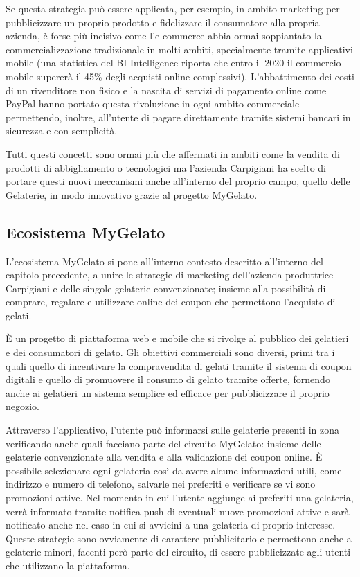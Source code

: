 Se questa strategia può essere applicata, per esempio, in ambito marketing per pubblicizzare un proprio prodotto e fidelizzare il consumatore alla propria azienda, è forse più incisivo come l'e-commerce abbia ormai soppiantato la commercializzazione tradizionale in molti ambiti, specialmente tramite applicativi mobile (una statistica del BI Intelligence riporta che entro il 2020 il commercio mobile supererà il 45\% degli acquisti online complessivi).
L'abbattimento dei costi di un rivenditore non fisico e la nascita di servizi di pagamento online come PayPal hanno portato questa rivoluzione in ogni ambito commerciale permettendo, inoltre, all'utente di pagare direttamente tramite sistemi bancari in sicurezza e con semplicità.

Tutti questi concetti sono ormai più che affermati in ambiti come la vendita di prodotti di abbigliamento o tecnologici ma l'azienda Carpigiani ha scelto di portare questi nuovi meccanismi anche all'interno del proprio campo, quello delle Gelaterie, in modo innovativo grazie al progetto MyGelato.

\subsection{Ecosistema MyGelato}

L'ecosistema MyGelato si pone all'interno contesto descritto all'interno del capitolo precedente, a unire le strategie di marketing dell'azienda produttrice Carpigiani e delle singole gelaterie convenzionate; insieme alla possibilità di comprare, regalare e utilizzare online dei coupon che permettono l'acquisto di gelati.

È un progetto di piattaforma web e mobile che si rivolge al pubblico dei gelatieri e dei consumatori di gelato. Gli obiettivi commerciali sono diversi, primi tra i quali quello di incentivare la compravendita di gelati tramite il sistema di coupon digitali e quello di promuovere il consumo di gelato tramite offerte, fornendo anche ai gelatieri un sistema semplice ed efficace per pubblicizzare il proprio negozio.

Attraverso l'applicativo, l'utente può informarsi sulle gelaterie presenti in zona verificando anche quali facciano parte del circuito MyGelato: insieme delle gelaterie convenzionate alla vendita e alla validazione dei coupon online.
È possibile selezionare ogni gelateria così da avere alcune informazioni utili, come indirizzo e numero di telefono, salvarle nei preferiti e verificare se vi sono promozioni attive.
Nel momento in cui l'utente aggiunge ai preferiti una gelateria, verrà informato tramite notifica push di eventuali nuove promozioni attive e sarà notificato anche nel caso in cui si avvicini a una gelateria di proprio interesse.
Queste strategie sono ovviamente di carattere pubblicitario e permettono anche a gelaterie minori, facenti però parte del circuito, di essere pubblicizzate agli utenti che utilizzano la piattaforma.

